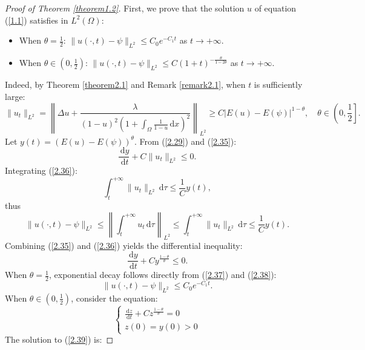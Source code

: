 \documentclass{article}
\numberwithin{equation}{section}
\begin{document}
\begin{proof}[Proof of Theorem \ref{theorem1.2}]
First, we prove that the solution $u$ of equation (\ref{1.1}) satisfies in $L^2(\Omega)$:
\begin{itemize}
    \item When $\theta=\frac{1}{2}$: $\|u(\cdot,t)-\psi\|_{L^2}\le C_0e^{-C_1t}$ as $t\to +\infty$.
    \item When $\theta\in (0,\frac{1}{2})$: $\|u(\cdot,t)-\psi\|_{L^2}\le C(1+t)^{-\frac{\theta}{1-2\theta}}$ as $t\to +\infty$.
\end{itemize}
  Indeed, by Theorem \ref{theorem2.1} and Remark \ref{remark2.1}, when $t$ is sufficiently large:
  \begin{equation}
    \|u_t\|_{L^2}= \left\|\Delta u+\frac{\lambda}{(1-u)^2(1+\int_{\Omega}\frac{1}{1-u}\,\mathrm{d}x)^2}\right\|_{L^{2}}\ge C|E(u)-E(\psi)|^{1-\theta},\quad \theta\in\left (0,\frac{1}{2}\right ].\label{2.35}
  \end{equation}
  Let $y(t)=(E(u)-E(\psi))^{\theta}$. From (\ref{2.29}) and (\ref{2.35}):
  \begin{equation}
      \frac{\,\mathrm{d}y}{\,\mathrm{d}t}+C\|u_t\|_{L^2}\le 0.\label{2.36}
  \end{equation}
  Integrating (\ref{2.36}):
  $$\int_{t}^{+\infty}\|u_t\|_{L^2}\,\mathrm{d}\tau\le \frac{1}{C}y(t),$$
  thus
  \begin{equation}
      \|u(\cdot,t)-\psi\|_{L^2}\le\left\|\int_{t}^{+\infty}u_t\,\mathrm{d}\tau\right\|_{L^2}\le\int_{t}^{+\infty}\|u_t\|_{L^2}\,\mathrm{d}\tau\le \frac{1}{C}y(t).\label{2.37}
  \end{equation}
  Combining (\ref{2.35}) and (\ref{2.36}) yields the differential inequality:
  \begin{equation}
      \frac{\,\mathrm{d}y}{\,\mathrm{d}t}+Cy^{\frac{1-\theta}{\theta}}\le 0.\label{2.38}
  \end{equation}
  \noindent
  When $\theta=\frac{1}{2}$, exponential decay follows directly from (\ref{2.37}) and (\ref{2.38}):
  $$\|u(\cdot,t)-\psi\|_{L^2}\le C_0e^{-C_1t}.$$
  \noindent
  When $\theta\in (0,\frac{1}{2})$, consider the equation:
  \begin{equation}
      \begin{cases}
          \frac{\,\mathrm{d}z}{\,\mathrm{d}t}+Cz^{\frac{1-\theta}{\theta}}=0 \\
          z(0)=y(0)>0 \label{2.39}
      \end{cases}
  \end{equation}
  The solution to (\ref{2.39}) is:

\end{proof}
\end{document}
